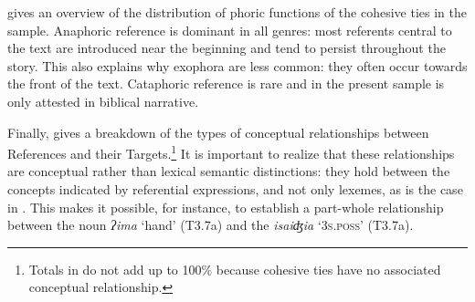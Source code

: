 \documentclass[output=paper
,modfonts
,nonflat]{langsci/langscibook}
\begin{document}
\noindent
{} gives an overview of the distribution of phoric functions of the cohesive ties in the sample. Anaphoric reference is dominant in all genres: most referents central to the text are introduced near the beginning and tend to persist throughout the story. This also explains why exophora are less common: they often occur towards the front of the text. Cataphoric reference is rare and in the present sample is only attested in biblical narrative.

Finally,  gives a breakdown of the types of conceptual relationships between References and their Targets.\footnote{Totals in  do not add up to 100\% because  cohesive ties have no associated conceptual relationship.} It is important to realize that these relationships are conceptual rather than lexical semantic distinctions: they hold between the concepts indicated by referential expressions, and not only lexemes, as is the case in \citet{Halliday1976}. This makes it possible, for instance, to establish a part-whole relationship between the noun \textit{ʔima} ‘hand’ (T3.7a) and the  \textit{isaiʤia} ‘\textsc{3s.poss}’ (T3.7a).
\end{document}
